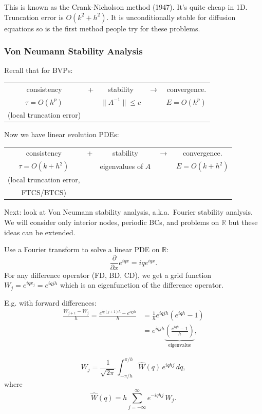 \documentclass[12pt, a4paper]{article}
\theoremstyle{definition}
\theoremstyle{remark}
\numberwithin{equation}{section}
\begin{document}
This is known as the Crank-Nicholson method (1947). It's quite cheap in 1D. Truncation
error is $O(k^2 + h^2)$. It is unconditionally stable for diffusion equations so is
the first method people try for these problems.

\newpage
\subsubsection{Von Neumann Stability Analysis}
Recall that for BVPs:
\begin{center} \begin{tabular}{ccccc} 
consistency & + & stability & $\rightarrow$ & convergence. \\
$\tau = O(h^p)$ & & $ \| A^{-1} \| \le c$ & & $E = O(h^p)$ \\
(local truncation error)
\end{tabular} \end{center}
Now we have linear evolution PDEs:
\begin{center} \begin{tabular}{ccccc} 
consistency & + & stability & $\rightarrow$ & convergence.\\
$\tau = O(k + h^2)$ & & eigenvalues of $A$ & & $E = O(k + h^2)$ \\
(local truncation error, \\FTCS/BTCS)
\end{tabular} \end{center}

Next: look at Von Neumann stability analysis, a.k.a.~Fourier stability
analysis. We will consider only interior nodes, periodic BCs, and problems
on $\mathbb{R}$ but these ideas can be extended.

Use a Fourier transform to solve a linear PDE on $\mathbb{R}$:
$$ \frac{\partial}{\partial x} e^{iqx} = iq e^{iqx}. $$
For any difference operator (FD, BD, CD), we get a grid function
\mbox{$W_j = e^{iqx_j} = e^{iqjh}$} which is an eigenfunction of the difference
operator.

E.g. with forward differences:
\begin{align*}
\frac{W_{j+1} - W_j}{h} = \frac{e^{iq(j+1)h} - e^{iqjh}}{h} &= \frac{1}{h} e^{iqjh}(e^{iqh} - 1) \\
&= e^{iqjh} \underbrace{\left( \frac{e^{iqh}-1}{h}\right)}_\text{eigenvalue},
\end{align*}

$$ W_j = \frac{1}{\sqrt{2\pi}} \int_{-\pi/h}^{\pi/h} \hat{W}(q) \, e^{iqhj} \, dq, $$
where
$$ \hat{W}(q) = h \sum_{j=-\infty}^\infty e^{-iqhj} \, W_j. $$
\end{document}
